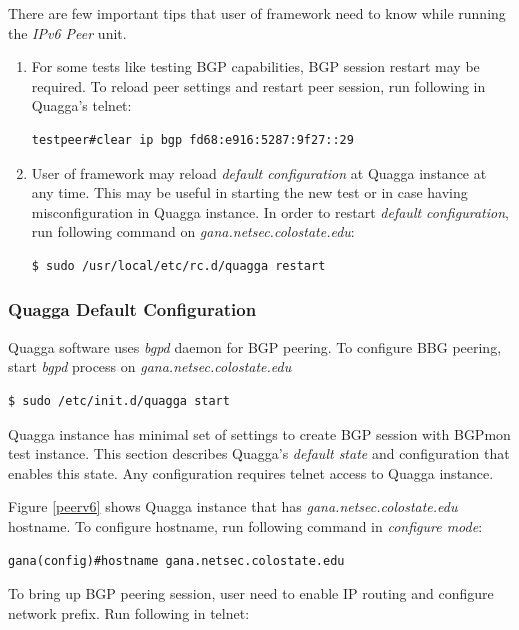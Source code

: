 There are few important tips that user of framework need to know while running the \emph{IPv6 Peer} unit. 

\begin{enumerate}

\item{ For some tests like testing BGP capabilities, BGP session restart may be required.  To reload peer settings and restart peer session, run following in Quagga's telnet:}
\begin{verbatim}
testpeer#clear ip bgp fd68:e916:5287:9f27::29
\end{verbatim}

\item{ User of framework may reload \emph{default configuration} at Quagga instance at any time. This may be useful in starting the new test or in case having misconfiguration in Quagga instance. In order to restart \emph{default configuration}, run following command on \emph{gana.netsec.colostate.edu}:}
\begin{verbatim}
$ sudo /usr/local/etc/rc.d/quagga restart
\end{verbatim}

\end{enumerate}


\subsubsection{Quagga Default Configuration}
\label{sec:quaggadef}

Quagga software uses \emph{bgpd} daemon for BGP peering. To configure BBG peering, start \emph{bgpd} process on \emph{gana.netsec.colostate.edu}
\begin{verbatim}
$ sudo /etc/init.d/quagga start
\end{verbatim}

Quagga instance  has minimal set of settings to create BGP session with BGPmon test instance.  This section describes Quagga's \emph{default state} and configuration that enables this state. Any configuration requires telnet  access to Quagga instance. 


Figure \ref{peerv6} shows Quagga instance that has \emph{gana.netsec.colostate.edu} hostname. To configure hostname, run following command in \emph{configure mode}:
\begin{verbatim}
gana(config)#hostname gana.netsec.colostate.edu
\end{verbatim}

To bring up BGP peering session, user need to enable IP routing and configure network prefix. Run following in telnet:

